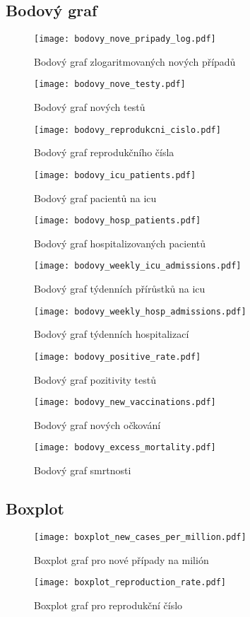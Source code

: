 \documentclass[a4paper, 12pt]{article}
\begin{document}
\subsection{Bodový graf}
\begin{figure}[H]
\centering

\texttt{[image: bodovy\_nove\_pripady\_log.pdf]}
\caption{Bodový graf zlogaritmovaných nových případů}

\texttt{[image: bodovy\_nove\_testy.pdf]}
\caption{Bodový graf nových testů}

\end{figure}
\begin{figure}[H]
\centering

\texttt{[image: bodovy\_reprodukcni\_cislo.pdf]}
\caption{Bodový graf reprodukčního čísla}

\texttt{[image: bodovy\_icu\_patients.pdf]}
\caption{Bodový graf pacientů na icu}

\end{figure}
\begin{figure}[H]
\centering

\texttt{[image: bodovy\_hosp\_patients.pdf]}
\caption{Bodový graf hospitalizovaných pacientů}

\texttt{[image: bodovy\_weekly\_icu\_admissions.pdf]}
\caption{Bodový graf týdenních přírůstků na icu}

\end{figure}
\begin{figure}[H]
\centering

\texttt{[image: bodovy\_weekly\_hosp\_admissions.pdf]}
\caption{Bodový graf týdenních hospitalizací}

\texttt{[image: bodovy\_positive\_rate.pdf]}
\caption{Bodový graf pozitivity testů}

\end{figure}
\begin{figure}[H]
\centering

\texttt{[image: bodovy\_new\_vaccinations.pdf]}
\caption{Bodový graf nových očkování}

\texttt{[image: bodovy\_excess\_mortality.pdf]}
\caption{Bodový graf smrtnosti}

\end{figure}
\subsection{Boxplot}
\begin{figure}[H]
\centering

\texttt{[image: boxplot\_new\_cases\_per\_million.pdf]}
\caption{Boxplot graf pro nové případy na milión}

\texttt{[image: boxplot\_reproduction\_rate.pdf]}
\caption{Boxplot graf pro reprodukční číslo}
\end{figure}
\end{document}
